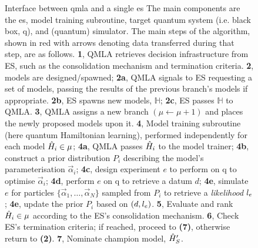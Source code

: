 \begin{figure}
\begin{center}
\begin{tikzpicture}[node distance=2.25cm]
    \end{tikzpicture}
    \end{center}
    
    \caption[Interface between QMLA and a single exploration strategy]{
        Interface between \acrfull{qmla} and a single \acrfull{es}
        The main components are the \gls{es}, model training subroutine, target quantum system (i.e. black box, \gls{q}), 
        and (quantum) simulator. 
        The main steps of the algorithm, shown in red with arrows denoting data transferred during that step, are as follows.
        \textbf{1}, QMLA retrieves decision infrastructure from ES, such as the consolidation mechanism and termination criteria.
        \textbf{2}, models are designed/spawned; 
        \textbf{2a}, QMLA signals to ES requesting a set of models, passing the results of the previous branch's models if appropriate.
        \textbf{2b}, ES spawns new models, $\mathbb{H}$;
        \textbf{2c}, ES passes $\mathbb{H}$ to QMLA. 
        \textbf{3}, QMLA assigns a new branch $(\mu \gets \mu + 1)$ and places the newly proposed models upon it.
        \textbf{4}, Model training subroutine (here quantum Hamiltonian learning), performed independently for each model $\hi \in \mu$; 
        \textbf{4a}, QMLA passes $\hi$ to the model trainer; 
        \textbf{4b}, construct a prior distribution $P_i$ describing the model's parameterisation $\vec{\alpha}_i$;
        \textbf{4c}, design experiment $e$ to perform on \gls{q} to optimise $\vec{\alpha}_i$;
        \textbf{4d}, perform $e$ on \gls{q} to retrieve a datum $d$;
        \textbf{4e}, simulate $e$ for \glspl{particle} $\{ \vec{\alpha}_1, \dots , \vec{\alpha}_N \}$ 
            sampled from $P_i$ to retrieve a \emph{likelihood} $\lk_{e}$;
        \textbf{4e}, update the prior $P_i$ based on $(d, \lk_{e})$.
        \textbf{5}, Evaluate and rank $\hi \in \mu$ according to the ES's consolidation mechanism.
        \textbf{6}, Check ES's termination criteria; if reached, proceed to \textbf{(7)}, otherwise return to \textbf{(2)}.
        \textbf{7}, Nominate \gls{champion model}, $\hp_{S}$.        
    }
    \label{fig:qmla_flow}
\end{figure}

   
